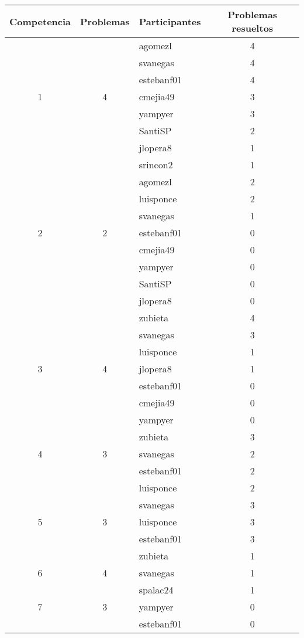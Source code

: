 \documentclass[conference]{IEEEtran}
\begin{document}
\begin{table}
	\centering
	\begin{tabular}{|c|c|l|c|}
		\hline
		\textbf{Competencia} & \textbf{Problemas} & \textbf{Participantes} & \textbf{Problemas resueltos} \\
		\hline
		  &   & agomezl  & 4\\
		  &   & svanegas & 4\\
		  &   & estebanf01 & 4\\
		1 & 4 & cmejia49 & 3\\
		  &   & yampyer & 3\\
		  &   & SantiSP & 2\\
		  &   & jlopera8 & 1\\
		  &   & srincon2 & 1\\
		\hline
		  &   & agomezl  & 2\\
		  &   & luisponce & 2\\
		  &   & svanegas & 1\\
		2 & 2 & estebanf01 & 0\\
		  &   & cmejia49 & 0\\
		  &   & yampyer & 0\\
		  &   & SantiSP & 0\\
		  &   & jlopera8 & 0\\
		\hline
		  &   & zubieta  & 4\\
		  &   & svanegas & 3\\
		  &   & luisponce & 1\\
		3 & 4 & jlopera8 & 1\\
		  &   & estebanf01 & 0\\
		  &   & cmejia49 & 0\\
		  &   & yampyer & 0\\
		\hline
		  &   & zubieta  & 3\\
		4 & 3 & svanegas & 2\\
		  &   & estebanf01 & 2\\
		  &   & luisponce & 2\\
		\hline 
		  &   & svanegas  & 3\\
		5 & 3 & luisponce & 3\\
		  &   & estebanf01 & 3\\
		  &   & zubieta & 1\\
		\hline
		6 & 4 & svanegas & 1\\
		  &   & spalac24 & 1\\
		\hline
		7 & 3 & yampyer & 0\\
		  &   & estebanf01 & 0\\

\end{tabular}
\end{table}
\end{document}
